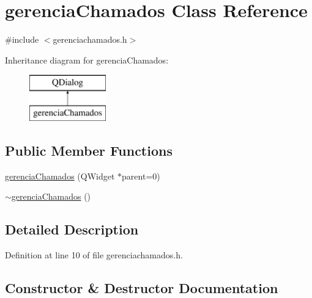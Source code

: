 \hypertarget{classgerencia_chamados}{}\section{gerencia\+Chamados Class Reference}
\label{classgerencia_chamados}


{\ttfamily \#include $<$gerenciachamados.\+h$>$}

Inheritance diagram for gerencia\+Chamados\+:\begin{figure}[H]
\begin{center}
\leavevmode
\includegraphics[height=2.000000cm]{classgerencia_chamados}
\end{center}
\end{figure}
\subsection*{Public Member Functions}
\begin{DoxyCompactItemize}
\item 
\hyperlink{classgerencia_chamados_a07839f849e9582ce8e695de48b4b0ebb}{gerencia\+Chamados} (Q\+Widget $\ast$parent=0)
\item 
\hyperlink{classgerencia_chamados_a393bdaec21bc5e91a03c4d4b02925682}{$\sim$gerencia\+Chamados} ()
\end{DoxyCompactItemize}


\subsection{Detailed Description}


Definition at line 10 of file gerenciachamados.\+h.



\subsection{Constructor \& Destructor Documentation}
\hypertarget{classgerencia_chamados_a07839f849e9582ce8e695de48b4b0ebb}{}\label{classgerencia_chamados_a07839f849e9582ce8e695de48b4b0ebb} 
